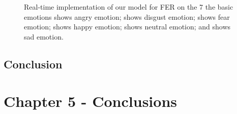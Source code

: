 \documentclass[master]{thesis-uestc}
\begin{document}
\begin{figure}
%
\hspace{8pt}%

\caption[Real-time implementation of the model for FER on the 7 the basic emotions]{Real-time implementation of our model for FER on the 7 the basic emotions
 shows angry emotion;
 shows disgust emotion;
 shows fear emotion;
 shows happy emotion;
 shows neutral emotion; and
 shows sad emotion.}
\label{fig:implementation}%
\end{figure}

\section{Conclusion}

\chapter{Chapter 5 - Conclusions}
\end{document}
